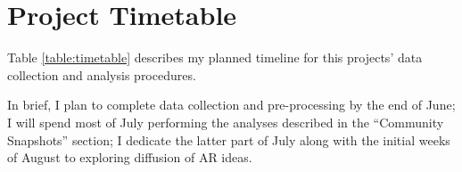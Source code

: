 \documentclass[acmlarge, screen, authorversion]{acmart}
\begin{document}
\section{Project Timetable}

Table \ref{table:timetable} describes my planned timeline for this projects' data collection and analysis procedures.

In brief, I plan to complete data collection and pre-processing by the end of June; I will spend most of July performing the analyses described in the ``Community Snapshots'' section; I dedicate the latter part of July along with the initial weeks of August to exploring diffusion of AR ideas.


\end{document}
